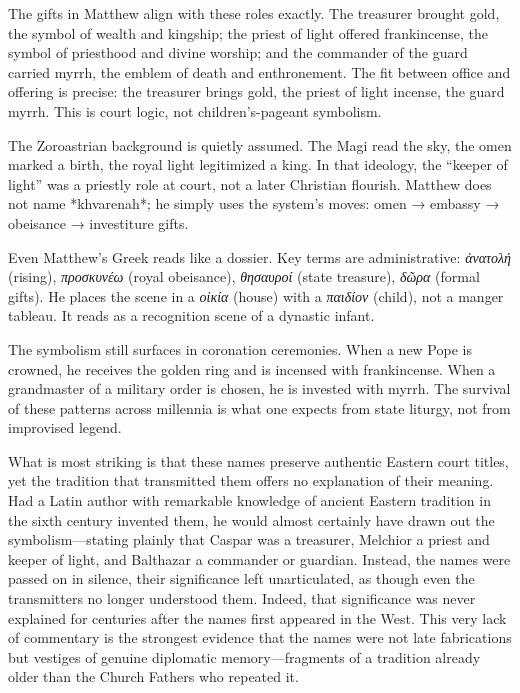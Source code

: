 The gifts in Matthew align with these roles exactly.
The treasurer brought gold, the symbol of wealth and kingship; the priest of light offered frankincense, the symbol of priesthood and divine worship; and the commander of the guard carried myrrh, the emblem of death and enthronement.
The fit between office and offering is precise: the treasurer brings gold, the priest of light incense, the guard myrrh.
This is court logic, not children’s-pageant symbolism.

The Zoroastrian background is quietly assumed.
The Magi read the sky, the omen marked a birth, the royal light legitimized a king.
In that ideology, the “keeper of light” was a priestly role at court, not a later Christian flourish.
Matthew does not name *khvarenah*; he simply uses the system’s moves: omen → embassy → obeisance → investiture gifts.

Even Matthew’s Greek reads like a dossier.
Key terms are administrative: \textit{ἀνατολή} (rising), \textit{προσκυνέω} (royal obeisance), \textit{θησαυροί} (state treasure), \textit{δῶρα} (formal gifts).
He places the scene in a \textit{οἰκία} (house) with a \textit{παιδίον} (child), not a manger tableau.
It reads as a recognition scene of a dynastic infant.

The symbolism still surfaces in coronation ceremonies.
When a new Pope is crowned, he receives the golden ring and is incensed with frankincense.
When a grandmaster of a military order is chosen, he is invested with myrrh.
The survival of these patterns across millennia is what one expects from state liturgy, not from improvised legend.

What is most striking is that these names preserve authentic Eastern court titles, yet the tradition that transmitted them offers no explanation of their meaning.
Had a Latin author with remarkable knowledge of ancient Eastern tradition in the sixth century invented them, he would almost certainly have drawn out the symbolism—stating plainly that Caspar was a treasurer, Melchior a priest and keeper of light, and Balthazar a commander or guardian.
Instead, the names were passed on in silence, their significance left unarticulated, as though even the transmitters no longer understood them.
Indeed, that significance was never explained for centuries after the names first appeared in the West.
This very lack of commentary is the strongest evidence that the names were not late fabrications but vestiges of genuine diplomatic memory—fragments of a tradition already older than the Church Fathers who repeated it.

